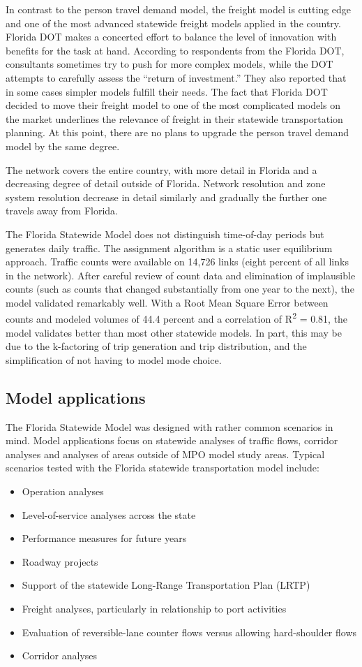 In contrast to the person travel demand model, the freight model is cutting edge and one of the most advanced statewide freight models applied in the country. Florida DOT makes a concerted effort to balance the level of innovation with benefits for the task at hand. According to respondents from the Florida DOT, consultants sometimes try to push for more complex models, while the DOT attempts to carefully assess the ``return of investment.'' They also reported that in some cases simpler models fulfill their needs. The fact that Florida DOT decided to move their freight model to one of the most complicated models on the market underlines the relevance of freight in their statewide transportation planning. At this point, there are no plans to upgrade the person travel demand model by the same degree.

The network covers the entire country, with more detail in Florida and a decreasing degree of detail outside of Florida. Network resolution and zone system resolution decrease in detail similarly and gradually the further one travels away from Florida.

The Florida Statewide Model does not distinguish time-of-day periods but generates daily traffic. The assignment algorithm is a static user equilibrium approach. Traffic counts were available on 14,726 links (eight percent of all links in the network). After careful review of count data and elimination of implausible counts (such as counts that changed substantially from one year to the next), the model validated remarkably well. With a Root Mean Square Error between counts and modeled volumes of 44.4 percent and a correlation of R\textsuperscript{2} = 0.81, the model validates better than most other statewide models. In part, this may be due to the k-factoring of trip generation and trip distribution, and the simplification of not having to model mode choice.

\subsection{Model applications}

The Florida Statewide Model was designed with rather common scenarios in mind. Model applications focus on statewide analyses of traffic flows, corridor analyses and analyses of areas outside of MPO model study areas. Typical scenarios tested with the Florida statewide transportation model include:

\begin{itemize}
\item Operation analyses
\item Level-of-service analyses across the state
\item Performance measures for future years
\item Roadway projects
\item Support of the statewide Long-Range Transportation Plan (LRTP)
\item Freight analyses, particularly in relationship to port activities
\item Evaluation of reversible-lane counter flows versus allowing hard-shoulder flows
\item Corridor analyses
\end{itemize}

